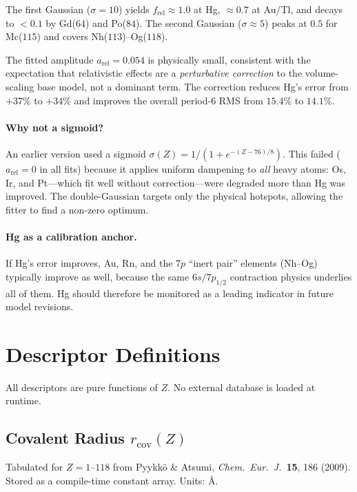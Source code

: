 \documentclass[11pt,letterpaper]{article}
\newcommand{\rcov}{r_{\mathrm{cov}}}
\begin{document}
The first Gaussian ($\sigma = 10$) yields $f_{\text{rel}} \approx 1.0$
at Hg, $\approx 0.7$ at Au/Tl, and decays to $< 0.1$ by Gd($64$)
and Po($84$).  The second Gaussian ($\sigma \approx 5$) peaks at
$0.5$ for Mc($115$) and covers Nh($113$)--Og($118$).

The fitted amplitude $a_{\text{rel}} = 0.054$ is physically small,
consistent with the expectation that relativistic effects are a
\emph{perturbative correction} to the volume-scaling base model, not
a dominant term.  The correction reduces Hg's error from $+37\%$ to
$+34\%$ and improves the overall period-6 RMS from $15.4\%$ to
$14.1\%$.

\paragraph{Why not a sigmoid?}
An earlier version used a sigmoid $\sigma(Z) = 1/(1 + e^{-(Z-76)/8})$.
This failed ($a_{\text{rel}} = 0$ in all fits) because it applies
uniform dampening to \emph{all} heavy atoms: Os, Ir, and Pt---which
fit well without correction---were degraded more than Hg was improved.
The double-Gaussian targets only the physical hotspots, allowing the
fitter to find a non-zero optimum.

\paragraph{Hg as a calibration anchor.}
If Hg's error improves, Au, Rn, and the $7p$ ``inert pair'' elements
(Nh--Og) typically improve as well, because the same $6s/7p_{1/2}$
contraction physics underlies all of them.  Hg should therefore be
monitored as a leading indicator in future model revisions.

\section{Descriptor Definitions}
\label{sec:descriptors}

All descriptors are pure functions of $Z$.  No external database is
loaded at runtime.

\subsection{Covalent Radius $\rcov(Z)$}

Tabulated for $Z=1$--$118$ from Pyykk\"o \& Atsumi, \emph{Chem.\ Eur.\
J.}\ \textbf{15}, 186 (2009).  Stored as a compile-time constant array.
Units: \AA.
\end{document}
